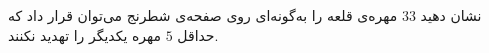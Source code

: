 \EXERCISE
نشان دهید
$33$
مهره‌ی قلعه را به‌گونه‌ای روی صفحه‌ی شطرنج می‌توان قرار داد که حداقل
$5$
مهره یکدیگر را تهدید نکنند.
